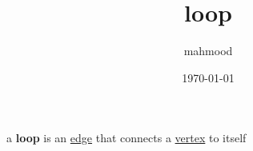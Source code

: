 \documentclass[a4paper,12pt]{article}
\author{mahmood}
\date{\today}
\title{loop}
\begin{document}
\maketitle
\begin{definition}
a \textbf{loop} is an \href{20230314001632-edge.org}{edge} that connects a \href{20230314001626-vertex.org}{vertex} to itself\\
\end{definition}
\end{document}
